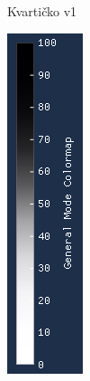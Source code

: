 \documentclass[times, utf8, diplomski]{fer}
\begin{document}
\begin{figure} [H]
\begin{subfigure}[h]{0.17\textwidth}
         \caption{Kvartičko v1}
         \label{fig:quartic_legend}
     \end{subfigure}
     \hfill
     \begin{subfigure}[h]{0.17\textwidth}
         \centering
         \includegraphics[width=\textwidth]{cubic_symmetrical_colormap.png}

\end{subfigure}
\end{figure}
\end{document}
